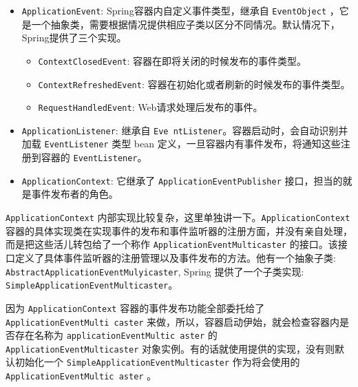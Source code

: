 \begin{itemize}
    \item \texttt{ApplicationEvent}: Spring容器内自定义事件类型，继承自 \texttt{EventObject} ，它是一个抽象类，需要根据情况提供相应子类以区分不同情况。默认情况下，Spring提供了三个实现。
    \begin{itemize}
        \item \texttt{ContextClosedEvent}: 容器在即将关闭的时候发布的事件类型。
        \item \texttt{ContextRefreshedEvent}: 容器在初始化或者刷新的时候发布的事件类型。
        \item \texttt{RequestHandledEvent}: Web请求处理后发布的事件。
    \end{itemize}
    \item \texttt{ApplicationListener}: 继承自 \texttt{Eve ntListener}。容器启动时，会自动识别并加载 \texttt{EventListener} 类型 bean 定义，一旦容器内有事件发布，将通知这些注册到容器的 \texttt{EventListener}。
    \item \texttt{ApplicationContext}: 它继承了 \texttt{ApplicationEventPublisher} 接口，担当的就是事件发布者的角色。
\end{itemize}

\texttt{ApplicationContext} 内部实现比较复杂，这里单独讲一下。\texttt{ApplicationContext} 容器的具体实现类在实现事件的发布和事件监听器的注册方面，并没有亲自处理，而是把这些活儿转包给了一个称作 \texttt{ApplicationEventMulticaster} 的接口。该接口定义了具体事件监听器的注册管理以及事件发布的方法。他有一个抽象子类: \texttt{AbstractApplicationEventMulyicaster}, Spring 提供了一个子类实现: \texttt{SimpleApplicationEventMulticaster}。

因为 \texttt{ApplicationContext} 容器的事件发布功能全部委托给了 \texttt{ApplicationEventMulti caster} 来做，所以，容器启动伊始，就会检查容器内是否存在名称为 \texttt{applicationEventMultic aster} 的 \texttt{ApplicationEventMulticaster} 对象实例。有的话就使用提供的实现，没有则默认初始化一个 \texttt{SimpleApplicationEventMulticaster} 作为将会使用的 \texttt{ApplicationEventMultic aster} 。

